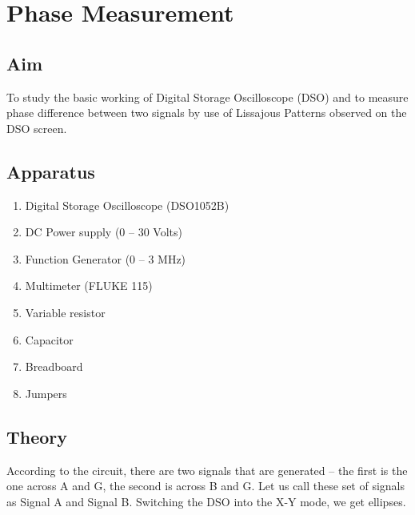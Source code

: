 \documentclass{article}
\begin{document}
\section{Phase Measurement}
\subsection{Aim}
To study the basic working of Digital Storage Oscilloscope (DSO) and to measure phase difference between two signals by use of Lissajous Patterns observed on the DSO screen.
\subsection{Apparatus}
\begin{enumerate}
    \item Digital Storage Oscilloscope (DSO1052B)
    \item DC Power supply (0 – 30 Volts)
    \item Function Generator (0 – 3 MHz)
    \item Multimeter (FLUKE 115)
    \item Variable resistor
    \item Capacitor
    \item Breadboard
    \item Jumpers
\end{enumerate}
\subsection{Theory}

\begin{figure}
\end{figure}

According to the circuit, there are two signals that are generated – the first is the one across A and G, the second is across B and G. Let us call these set of signals as Signal A and Signal B. Switching the DSO into the X-Y mode, we get ellipses. 

\begin{figure}
\end{figure}
\end{document}
